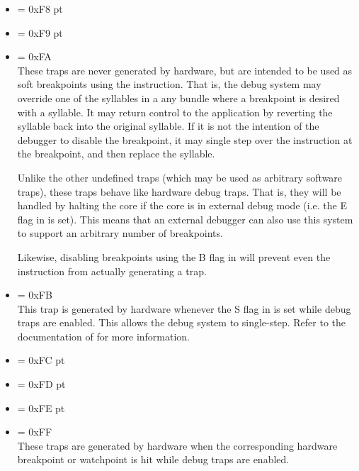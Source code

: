 \begin{itemize}
\setcounter{enumi}{247}
\item {} \label{trap:SOFT_DEBUG_0}  = 0xF8
 pt\relax
\item {} \label{trap:SOFT_DEBUG_1}  = 0xF9
 pt\relax
\item {} \label{trap:SOFT_DEBUG_2}  = 0xFA
\\[6 pt]
These traps are never generated by hardware, but are intended to be used as soft
breakpoints using the  instruction. That is, the debug system may
override one of the syllables in a any bundle where a breakpoint is desired with
a  syllable. It may return control to the application by reverting
the  syllable back into the original syllable. If it is not the
intention of the debugger to disable the breakpoint, it may single step over
the instruction at the breakpoint, and then replace the  syllable.

Unlike the other undefined traps (which may be used as arbitrary software
traps), these traps behave like hardware debug traps. That is, they will be
handled by halting the core if the core is in external debug mode (i.e. the E
flag in  is set). This means that an external debugger can also use
this system to support an arbitrary number of breakpoints.

Likewise, disabling breakpoints using the B flag in  will prevent even
the  instruction from actually generating a trap.

\setcounter{enumi}{250}
\item {} \label{trap:STEP_COMPLETE}  = 0xFB
\\[6 pt]
This trap is generated by hardware whenever the S flag in  is set
while debug traps are enabled. This allows the debug system to single-step.
Refer to the documentation of  for more information.

\setcounter{enumi}{251}
\item {} \label{trap:HW_BREAKPOINT_0}  = 0xFC
 pt\relax
\item {} \label{trap:HW_BREAKPOINT_1}  = 0xFD
 pt\relax
\item {} \label{trap:HW_BREAKPOINT_2}  = 0xFE
 pt\relax
\item {} \label{trap:HW_BREAKPOINT_3}  = 0xFF
\\[6 pt]
These traps are generated by hardware when the corresponding hardware breakpoint
or watchpoint is hit while debug traps are enabled.

\end{itemize}
